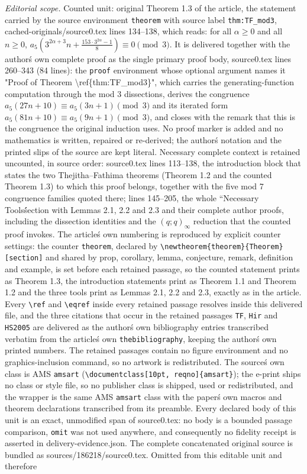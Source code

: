 \documentclass[10pt,a4paper]{amsart}
\theoremstyle{definition}
\theoremstyle{example}
\begin{document}
\noindent\textit{Editorial scope.} Counted unit: original Theorem 1.3 of the article, the statement carried by the source environment \texttt{theorem} with source label \texttt{thm:TF\_mod3}, cached-originals/source0.tex lines 134--138, which reads: for all $\alpha\geq 0$ and all $n\geq 0$, $a_{5}\left(3^{2\alpha + 3}n + \frac{153\cdot 3^{2\alpha} - 1}{8}\right) \equiv 0 \pmod{3}$. It is delivered together with the author\'s own complete proof as the single primary proof body, source0.tex lines 260--343 (84 lines): the \texttt{proof} environment whose optional argument names it "Proof of Theorem \textbackslash ref\{thm:TF\_mod3\}", which carries the generating-function computation through the mod 3 dissections, derives the congruence $a_5(27n+10)\equiv a_5(3n+1)\pmod 3$ and its iterated form $a_5(81n+10)\equiv a_5(9n+1)\pmod 3$, and closes with the remark that this is the congruence the original induction uses. No proof marker is added and no mathematics is written, repaired or re-derived; the author\'s notation and the printed slips of the source are kept literal. Necessary complete context is retained uncounted, in source order: source0.tex lines 113--138, the introduction block that states the two Thejitha--Fathima theorems (Theorem 1.2 and the counted Theorem 1.3) to which this proof belongs, together with the five mod 7 congruence families quoted there; lines 145--205, the whole ``Necessary Tools\'\' section with Lemmas 2.1, 2.2 and 2.3 and their complete author proofs, including the dissection identities and the $(q;q)_\infty$ reduction that the counted proof invokes. The article\'s own numbering is reproduced by explicit counter settings: the counter \texttt{theorem}, declared by \texttt{\textbackslash newtheorem\{theorem\}\{Theorem\}[section]} and shared by prop, corollary, lemma, conjecture, remark, definition and example, is set before each retained passage, so the counted statement prints as Theorem 1.3, the introduction statements print as Theorem 1.1 and Theorem 1.2 and the three tools print as Lemmas 2.1, 2.2 and 2.3, exactly as in the article. Every \texttt{\textbackslash ref} and \texttt{\textbackslash eqref} inside every retained passage resolves inside this delivered file, and the three citations that occur in the retained passages \texttt{TF}, \texttt{Hir} and \texttt{HS2005} are delivered as the author\'s own bibliography entries transcribed verbatim from the article\'s own \texttt{thebibliography}, keeping the author\'s own printed numbers. The retained passages contain no figure environment and no graphics-inclusion command, so no artwork is redistributed. The source\'s own class is AMS \texttt{amsart} (\texttt{\textbackslash documentclass[10pt, reqno]\{amsart\}}); the e-print ships no class or style file, so no publisher class is shipped, used or redistributed, and the wrapper is the same AMS \texttt{amsart} class with the paper\'s own macros and theorem declarations transcribed from its preamble. Every declared body of this unit is an exact, unmodified span of source0.tex: no body is a bounded passage comparison, \texttt{omit} was not used anywhere, and consequently no fidelity receipt is asserted in delivery-evidence.json. The complete concatenated original source is bundled as sources/186218/source0.tex. Omitted from this editable unit and therefore 
\end{document}
